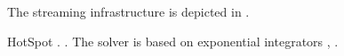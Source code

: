 
The streaming infrastructure is depicted in .

HotSpot \cite{skadron2004}.
 \cite{sridhar2010}.
The solver is based on exponential integrators \cite{hochbruck2010},
\cite{ukhov2012}.
